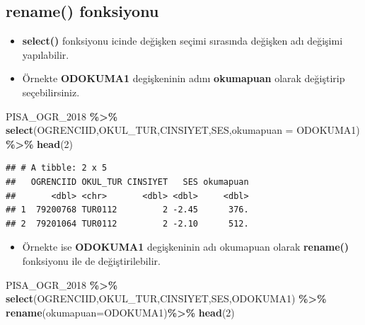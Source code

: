 \documentclass[
  oneside]{book}
\newenvironment{Shaded}{\begin{snugshade}}{\end{snugshade}}
\newcommand{\AttributeTok}[1]{\textcolor[rgb]{0.13,0.29,0.53}{#1}}
\newcommand{\DecValTok}[1]{\textcolor[rgb]{0.00,0.00,0.81}{#1}}
\newcommand{\FunctionTok}[1]{\textcolor[rgb]{0.13,0.29,0.53}{\textbf{#1}}}
\newcommand{\NormalTok}[1]{#1}
\newcommand{\SpecialCharTok}[1]{\textcolor[rgb]{0.81,0.36,0.00}{\textbf{#1}}}
\providecommand{\tightlist}{%
  \setlength{\itemsep}{0pt}\setlength{\parskip}{0pt}}
\begin{document}
\hypertarget{rename-fonksiyonu}{%
\subsection{\texorpdfstring{\textbf{rename()} fonksiyonu}{rename() fonksiyonu}}\label{rename-fonksiyonu}}

\begin{itemize}
\item
  \textbf{select()} fonksiyonu icinde değişken seçimi sırasında değişken adı değişimi yapılabilir.
\item
  Örnekte \textbf{ODOKUMA1} degişkeninin adını \textbf{okumapuan} olarak değiştirip seçebilirsiniz.
\end{itemize}

\begin{Shaded}
\begin{Highlighting}[]
\NormalTok{PISA\_OGR\_2018 }\SpecialCharTok{\%\textgreater{}\%}
\FunctionTok{select}\NormalTok{(OGRENCIID,OKUL\_TUR,CINSIYET,SES,}\AttributeTok{okumapuan =}\NormalTok{ ODOKUMA1) }\SpecialCharTok{\%\textgreater{}\%}
\FunctionTok{head}\NormalTok{(}\DecValTok{2}\NormalTok{)}
\end{Highlighting}
\end{Shaded}

\begin{verbatim}
## # A tibble: 2 x 5
##   OGRENCIID OKUL_TUR CINSIYET   SES okumapuan
##       <dbl> <chr>       <dbl> <dbl>     <dbl>
## 1  79200768 TUR0112         2 -2.45      376.
## 2  79201064 TUR0112         2 -2.10      512.
\end{verbatim}

\begin{itemize}
\tightlist
\item
  Örnekte ise \textbf{ODOKUMA1} degişkeninin adı okumapuan olarak \textbf{rename()} fonksiyonu ile de değiştirilebilir.
\end{itemize}

\begin{Shaded}
\begin{Highlighting}[]
\NormalTok{PISA\_OGR\_2018 }\SpecialCharTok{\%\textgreater{}\%}
\FunctionTok{select}\NormalTok{(OGRENCIID,OKUL\_TUR,CINSIYET,SES,ODOKUMA1) }\SpecialCharTok{\%\textgreater{}\%}
\FunctionTok{rename}\NormalTok{(}\AttributeTok{okumapuan=}\NormalTok{ODOKUMA1)}\SpecialCharTok{\%\textgreater{}\%}
\FunctionTok{head}\NormalTok{(}\DecValTok{2}\NormalTok{)}
\end{Highlighting}
\end{Shaded}
\end{document}
